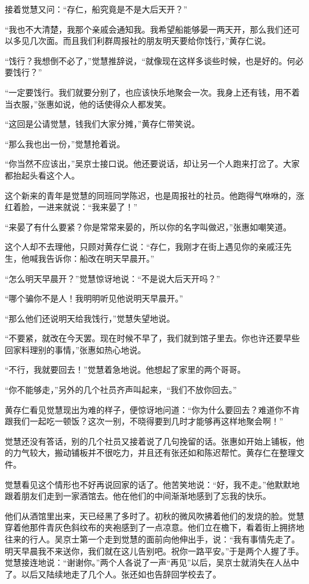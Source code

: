 \par 接着觉慧又问：“存仁，船究竟是不是大后天开？”
\par “我也不大清楚，我那个亲戚会通知我。我希望船能够晏一两天开，那么我们还可以多见几次面。而且我们利群周报社的朋友明天要给你饯行，”黄存仁说。
\par “饯行？我想倒不必了，”觉慧推辞说，“就像现在这样多谈些时候，也是好的。何必要饯行？”
\par “一定要饯行。我们就要分别了，也应该快乐地聚会一次。我身上还有钱，用不着当衣服，”张惠如说，他的话使得众人都发笑。
\par “这回是公请觉慧，钱我们大家分摊，”黄存仁带笑说。
\par “那么我也出一份，”觉慧抢着说。
\par “你当然不应该出，”吴京士接口说。他还要说话，却让另一个人跑来打岔了。大家都抬起头看这个人。
\par 这个新来的青年是觉慧的同班同学陈迟，也是周报社的社员。他跑得气咻咻的，涨红着脸，一进来就说：“我来晏了！”
\par “来晏了有什么要紧？你是常常来晏的，所以你的名字叫做迟，”张惠如嘲笑道。
\par 这个人却不去理他，只顾对黄存仁说：“存仁，我刚才在街上遇见你的亲戚汪先生，他喊我告诉你：船改在明天早晨开。”
\par “怎么明天早晨开？”觉慧惊讶地说：“不是说大后天开吗？”
\par “哪个骗你不是人！我明明听见他说明天早晨开。”
\par “那么他们还说明天给我饯行，”觉慧失望地说。
\par “不要紧，就改在今天罢。现在时候不早了，我们就到馆子里去。你也许还要早些回家料理别的事情，”张惠如热心地说。
\par “不行，我就要回去！”觉慧着急地说。他想起了家里的两个哥哥。
\par “你不能够走，”另外的几个社员齐声叫起来，“我们不放你回去。”
\par 黄存仁看见觉慧现出为难的样子，便惊讶地问道：“你为什么要回去？难道你不肯跟我们一起吃一顿饭？这次一别，不晓得要到几时才能够再这样地聚会啊！”
\par 觉慧还没有答话，别的几个社员又接着说了几句挽留的话。张惠如开始上铺板，他的力气较大，搬动铺板并不很吃力，并且还有张还如和陈迟帮忙。黄存仁在整理文件。
\par 觉慧看见这个情形也不好再说回家的话了。他苦笑地说：“好，我不走。”他默默地跟着朋友们走到一家酒馆去。他在他们的中间渐渐地感到了忘我的快乐。
\par 他们从酒馆里出来，天已经黑了多时了。初秋的微风吹拂着他们的发烧的脸。觉慧穿着他那件青灰色斜纹布的夹袍感到了一点凉意。他们立在檐下，看着街上拥挤地往来的行人。吴京士第一个走到觉慧的面前向他伸出手，说：“我有事情先走了。明天早晨我不来送你，我们就在这儿告别吧。祝你一路平安。”于是两个人握了手。觉慧接连地说：“谢谢你。”两个人各说了一声“再见”以后，吴京士就消失在人丛中了。以后又陆续地走了几个人。张还如也告辞回学校去了。
